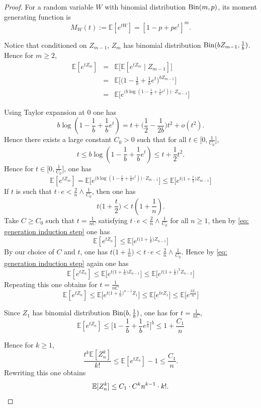 \documentclass[12pt]{article}
\numberwithin{equation}{section}
\newcommand{\be}{\begin{equation}}
\newcommand{\ee}{\end{equation}}
\newcommand{\1}{\mathbf{1}}
\begin{document}
\begin{proof}
	For a random variable $W$ with binomial distribution $\textnormal{Bin}(m,p)$, its moment generating function is 
	\[
	M_W(t):=\mathbb{E}[e^{tW}]=[1-p+pe^{t}]^m.
	\] 
	
	
	Notice that conditioned on $Z_{m-1}$, $Z_m$ has binomial distribution  $\textnormal{Bin}(bZ_{m-1},\frac{1}{b})$. Hence for $m\geq2$,
	\begin{eqnarray}
	\mathbb{E}[e^{tZ_m}]&=&\mathbb{E}\big[\mathbb{E}[e^{tZ_m}\mid Z_{m-1}]\big]\nonumber\\
	&=&\mathbb{E}\big[\big(1-\frac{1}{b}+\frac{1}{b}e^t\big)^{bZ_{m-1}}\big]\nonumber\\
	&=&\mathbb{E}\big[e^{\big( b\log(1-\frac{1}{b}+\frac{1}{b}e^t)\big)\cdot Z_{m-1} }\big]
	\end{eqnarray}
	
	Using Taylor expansion at $0$ one has
	\[
	b\log(1-\frac{1}{b}+\frac{1}{b}e^t)=t+\big(\frac{1}{2}-\frac{1}{2b}\big)t^2+o(t^2).
	\]	
	Hence there exists a large constant $C_0>0$ such that for all $t\in\big[0,\frac{1}{C_0}\big]$, 
	\[
	t\leq b\log(1-\frac{1}{b}+\frac{1}{b}e^t)\leq t+\frac{1}{2}t^2.
	\]	
	Hence for $t\in \big[0,\frac{1}{C_0}\big]$,  one  has 
	\be\label{eq: generation induction step}
	\mathbb{E}[e^{tZ_m}]=\mathbb{E}\big[e^{\big( b\log(1-\frac{1}{b}+\frac{1}{b}e^t)\big)\cdot Z_{m-1} }\big]
	\leq \mathbb{E}\big[e^{t\big(1+\frac{t}{2}\big)Z_{m-1}}\big]
	\ee
	If $t$ is such that $t\cdot e<\frac{2}{n}\wedge \frac{1}{C_0}$, then one has $$t\big(1+\frac{t}{2}\big)<t(1+\frac{1}{n}).$$
	Take $C\geq C_0$ such that  $t=\frac{1}{nC}$ satisfying $t\cdot e<\frac{2}{n}\wedge \frac{1}{C_0}$ for all $n\geq1$, then by \eqref{eq: generation induction step} one has  
	\[
	\mathbb{E}[e^{tZ_n}]\leq \mathbb{E}\big[e^{t\big(1+\frac{1}{n}\big)Z_{n-1}}\big]
	\]
	By our choice of $C$ and $t$, one has $t\big(1+\frac{1}{n}\big)<t\cdot e<\frac{2}{n}\wedge \frac{1}{C_0}$. Hence by \eqref{eq: generation induction step} again one has 
	\[
	\mathbb{E}[e^{tZ_n}]\leq \mathbb{E}\big[e^{t\big(1+\frac{1}{n}\big)Z_{n-1}}\big]\leq 
	\mathbb{E}\big[e^{t\big(1+\frac{1}{n}\big)^2Z_{n-2}}\big]
	\]
	Repeating this one obtains for $t=\frac{1}{nC}$
	\[
	\mathbb{E}[e^{tZ_n}]\leq\mathbb{E}\big[e^{t\big(1+\frac{1}{n}\big)^{n-1}Z_{1}}\big]\leq \mathbb{E}\big[e^{teZ_1}\big]\leq \mathbb{E}\big[e^{\frac{2Z_1}{n}}\big]
	\]
	
	Since $Z_1$ has binomial distribution $\textnormal{Bin}(b,\frac{1}{b})$,
	one has for $t=\frac{1}{nC}$,
	\be\label{eq: moment generating function of Z_n  with t small}
	\mathbb{E}[e^{tZ_n}]\leq \big[1-\frac{1}{b}+\frac{1}{b}e^{\frac{2}{n}}\big]^b\leq 1+\frac{C_1}{n}
	\ee
	
	Hence for $k\geq1$,
	\[
	\frac{t^k\mathbb{E}[Z_n^k]}{k!}\leq 	\mathbb{E}[e^{tZ_n}]-1\leq \frac{C_1}{n}.
	\]
	Rewriting this one obtains 
	\[
	\mathbb{E}[Z_n^k]\leq C_1\cdot C^kn^{k-1} \cdot k!.\qedhere
	\]
\end{proof}
\end{document}
